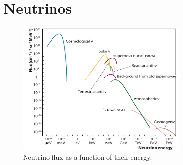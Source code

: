 \section{Neutrinos}

\begin{figure}
  \centering
  \includegraphics[width=0.75\textwidth]{content/plots/halftime/neutrinos-energy.png}
  \caption{Neutrino flux as a function of their energy.}
  \label{fig:neutrinos:flux_spectrum}
\end{figure}

\blindtext[8]
